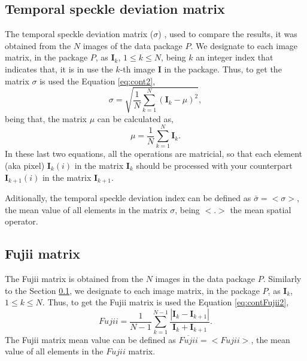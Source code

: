 \documentclass[review]{elsarticle}
\begin{document}
\subsection{Temporal speckle deviation matrix}
\label{subsec:deviation}
The temporal speckle deviation matrix ($\sigma$) \cite{Nothdurft:05},
used to compare the results, it was obtained from the $N$ images of the data package $P$.
We designate to each image matrix, in the package $P$, as $\mathbf{I}_{k}$, $1\leq k \leq N$, 
being $k$ an integer index that indicates that, it is in use the $k$-th image $\mathbf{I}$ in the package.
Thus, to get
the matrix $\sigma$ is used the Equation \ref{eq:cont2}, 
\begin{equation}\label{eq:cont2}
\sigma  = \sqrt{ \frac{1}{N} \sum_{k=1}^{N} (\mathbf{I}_{k}-\mu)^2  },
\end{equation}
being that, the matrix $\mu$ can be calculated as, 
\begin{equation}\label{eq:cont1}
\mu =  \frac{1}{N} \sum_{k=1}^{N} \mathbf{I}_{k}.
\end{equation}
In these last two equations, all the operations are matricial, 
so that each element (aka pixel) $\mathbf{I}_{k}(i)$ in the matrix $\mathbf{I}_{k}$
should be processed with your  counterpart $\mathbf{I}_{k+1}(i)$ in the matrix $\mathbf{I}_{k+1}$.


Aditionally, the temporal speckle deviation index can be defined as $\bar{\sigma}=<\sigma>$, the mean value
of all elements in the matrix $\sigma$, being $<.>$ the mean spatial operator.


\subsection{Fujii matrix}
\label{subsec:fujii}

The Fujii matrix \cite{Fujii:87} is obtained from the $N$ images in the data package $P$.
Similarly to the Section \ref{subsec:deviation}, 
we designate to each image matrix, in the package $P$, as $\mathbf{I}_{k}$, $1\leq k \leq N$.
Thus, to get the Fujii matrix is used the Equation \ref{eq:contFujii2}, 
\begin{equation}\label{eq:contFujii2}
Fujii  = \frac{1}{N-1} \sum_{k=1}^{N-1} \frac{|\mathbf{I}_{k}-\mathbf{I}_{k+1}|}{\mathbf{I}_{k}+\mathbf{I}_{k+1}}.
\end{equation} 
The  Fujii matrix mean value can be defined as $\overline{Fujii}=<Fujii>$, the mean value
of all elements in the $Fujii$ matrix.
\end{document}
